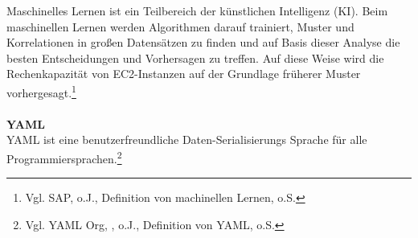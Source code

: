 Maschinelles Lernen ist ein Teilbereich der künstlichen Intelligenz (KI). Beim maschinellen Lernen werden Algorithmen darauf trainiert, Muster und Korrelationen in großen Datensätzen zu finden und auf Basis dieser Analyse die besten Entscheidungen und Vorhersagen zu treffen. Auf diese Weise wird die Rechenkapazität von EC2-Instanzen auf der Grundlage früherer Muster vorhergesagt.\footnote{Vgl. SAP, o.J., Definition von machinellen Lernen, o.S.\cite{ML1}}
\\\\
\textbf{YAML}\\
YAML ist eine benutzerfreundliche Daten-Serialisierungs  Sprache für alle Programmiersprachen.\footnote{Vgl. YAML Org, , o.J., Definition von YAML, o.S.\cite{YAML}}
